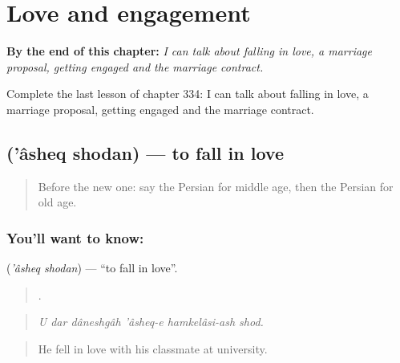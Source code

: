 
\chapter{Love and engagement}
\label{ch:fa-love-and-engagement}

\begin{chapteropening}
\textbf{By the end of this chapter:} \emph{I can talk about falling in love, a marriage proposal, getting engaged and the marriage contract.}

Complete the last lesson of chapter 334: I can talk about falling in love, a marriage proposal, getting engaged and the marriage contract.
\end{chapteropening}

\section[\texorpdfstring{\fa{عاشق} \fa{شدن} ('âsheq shodan)}{عاشق شدن ('âsheq shodan)}]{  ('âsheq shodan) — to fall in love}

\label{lesson:FA-C334-asheq-shodan}



\begin{quote}
Before the new one: say the Persian for middle age, then the Persian for old age.
\end{quote}

\subsection*{You'll want to know:  }
\textbf{ } (\emph{'âsheq shodan}) — \textquotedblleft{}to fall in love\textquotedblright{}.

\begin{quote}
      .
\end{quote}

\begin{quote}
\emph{U dar dâneshgâh 'âsheq-e hamkelâsi-ash shod.}
\end{quote}

\begin{quote}
He fell in love with his classmate at university.
\end{quote}

